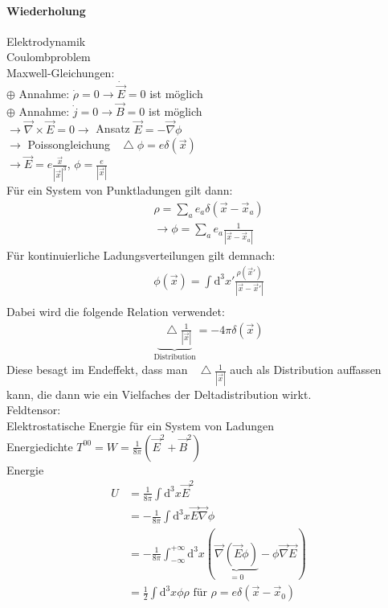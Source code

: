 \documentclass[a4paper]{article}
\newcommand*\laplace{\mathop{}\!\mathbin\bigtriangleup}
\begin{document}
\paragraph{Wiederholung}
Elektrodynamik\\
Coulombproblem\\
Maxwell-Gleichungen:\\
$\oplus$ Annahme: $\dot{\rho}=0\rightarrow \dot{\vec{E}}=0$ ist möglich\\
$\oplus$ Annahme: $\dot{j}=0\rightarrow \vec{B}=0$ ist möglich\\
$\rightarrow \vec{\nabla}\times\vec{E}=0 \rightarrow$ Ansatz
$\vec{E}=-\vec{\nabla}\phi$\\
$\rightarrow$ Poissongleichung $\laplace\phi=e\delta(\vec{x})$\\
$\rightarrow \vec{E}=e\frac{\vec{x}}{|\vec{x}|^3}$, $\phi=\frac{e}{|\vec{x}|}$\\
Für ein System von Punktladungen gilt dann:
\begin{align}
\rho=\sum_a e_a \delta(\vec{x}-\vec{x}_a)\\
\rightarrow \phi=\sum_a e_a \frac{1}{|\vec{x}-\vec{x}_a|}
\end{align}
Für kontinuierliche Ladungsverteilungen gilt demnach:
\begin{align}
\phi(\vec{x})=\int \mathrm{d}^3x'\frac{\rho(\vec{x}')}{|\vec{x}-\vec{x}'|}\\
\end{align}
Dabei wird die folgende Relation verwendet:
\begin{align}
\underbrace{\laplace
\frac{1}{|\vec{x}|}}_{\text{Distribution}}=-4\pi\delta(\vec{x})
\end{align}
Diese besagt im Endeffekt, dass man $\laplace \frac{1}{|\vec{x}|}$ auch als
Distribution auffassen kann, die dann wie ein Vielfaches der Deltadistribution
wirkt.\\
Feldtensor:\\
Elektrostatische Energie für ein System von Ladungen\\
Energiedichte $T^{00}=W=\frac{1}{8\pi}\left(\vec{E}^2+\vec{B}^2\right)$\\
Energie 
\begin{align}
U&=\frac{1}{8\pi}\int \mathrm{d}^3x \vec{E}^2\\
&=-\frac{1}{8\pi}\int \mathrm{d}^3x \vec{E}\vec{\nabla}\phi\\
&=-\frac{1}{8\pi}\int^{+\infty}_{-\infty} \mathrm{d}^3x \left(
\underbrace{\vec{\nabla}\left(\vec{E}\phi\right)}_{=0}-\phi\vec{\nabla}\vec{E}\right)\\
&=\frac{1}{2}\int \mathrm{d}^3x\phi\rho \text{ für } \rho=e\delta(\vec{x}-\vec{x}_0)
\end{align}
\end{document}
